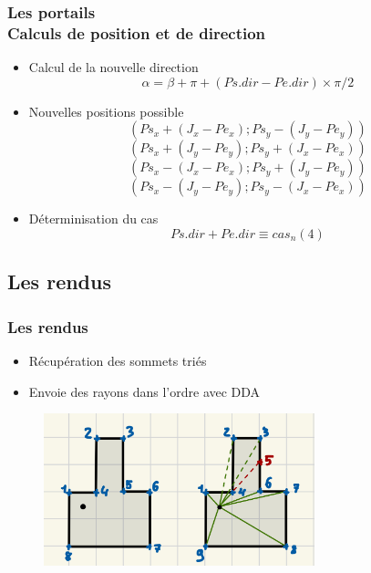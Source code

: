 \documentclass{beamer}
\begin{document}
\begin{frame}
    \frametitle{Les portails \\
                \small Calculs de position et de direction}
    \begin{block}{}
        \begin{itemize}
            \item Calcul de la nouvelle direction
            $$\alpha = \beta + \pi + (Ps.dir - Pe.dir) \times \pi / 2$$
        \end{itemize}
    \end{block}
    \begin{block}{}
        \begin{itemize}
            \item Nouvelles positions possible
            $$(Ps_x + (J_x - Pe_x) ; Ps_y - (J_y - Pe_y))$$
            $$(Ps_x + (J_y - Pe_y) ; Ps_y + (J_x - Pe_x))$$
            $$(Ps_x - (J_x - Pe_x) ; Ps_y + (J_y - Pe_y))$$
            $$(Ps_x - (J_y - Pe_y) ; Ps_y - (J_x - Pe_x))$$
        \end{itemize}
        \begin{itemize}
            \item Déterminisation du cas 
            $$Ps.dir + Pe.dir \equiv cas_n (4)$$
        \end{itemize}
        
    \end{block} 
\end{frame}

\subsection{Les rendus}

\begin{frame}
    \frametitle{Les rendus}
    \begin{block}{}
        \begin{itemize}
            \item Récupération des sommets triés 
            \item Envoie des rayons dans l'ordre avec DDA
        \end{itemize}
    \end{block}
    \begin{figure}
        \centering
        \includegraphics[width=0.7\textwidth]{images/envoie-rayon-ordre.jpg}
    \end{figure}
\end{frame}
\end{document}
